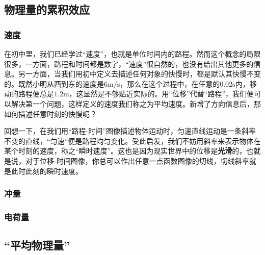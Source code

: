 
\subsection{物理量的累积效应}
\subsubsection{速度}
在初中里，我们已经学过“速度”，也就是单位时间内的路程。然而这个概念的局限很多，一方面，路程和时间都是数字，“速度”很自然的，也没有给出其他更多的信息。另一方面，当我们用初中定义去描述任何对象的快慢时，都是默认其快慢不变的。既然小明从西到东的速度是$6 \mathrm{m/s}$，那么在这个过程中，在任意的$0.02\mathrm s$内，移动的路程便总是$1.2\mathrm m$，这显然是不够贴近实际的。用“位移”代替“路程”，我们便可以解决第一个问题，这样定义的速度我们称之为平均速度。新增了方向信息后，那如何描述任意时刻的快慢呢？

回想一下，在我们用“路程-时间”图像描述物体运动时，匀速直线运动是一条斜率不变的直线，“匀速”便是路程均匀变化。受此启发，我们不妨用斜率来表示物体在某个时刻的速度，称之“瞬时速度”。这也是因为现实世界中的位移是\textbf{光滑}的，也就是说，对于位移-时间图像，你总可以作出任意一点函数图像的切线，切线斜率就是此时此刻的瞬时速度。
\subsubsection{冲量}
\subsubsection{电荷量}
\subsection{“平均物理量”}